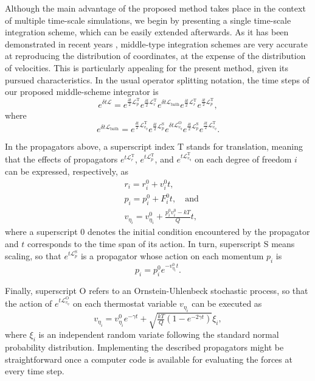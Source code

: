 \documentclass[
aip,
jcp,
reprint,
]{revtex4-1}
\newcommand{\vt}[1]{\boldsymbol{\mathbf{#1}}}          %
\newcommand{\Liu}{\mathcal{L}}
\begin{document}
Although the main advantage of the proposed method takes place in the context of multiple time-scale simulations, we begin by presenting a single time-scale integration scheme, which can be easily extended afterwards.
As it has been demonstrated in recent years \cite{Leimkuhler_2013b, Zhang_2017, Li_2017, Fass_2018, Zhang_2019}, middle-type integration schemes are very accurate at reproducing the distribution of coordinates, at the expense of the distribution of velocities.
This is particularly appealing for the present method, given its pursued characteristics.
In the usual operator splitting notation, the time steps of our proposed middle-scheme integrator is \cite{Zhang_2017}
\begin{equation*}
e^{\delta t\Liu} = e^{\frac{\delta t}{2} \Liu^\mathrm{T}_p} e^{\frac{\delta t}{2} \Liu^\mathrm{T}_r} e^{\delta t\Liu_\mathrm{bath}} e^{\frac{\delta t}{2} \Liu^\mathrm{T}_r} e^{\frac{\delta t}{2} \Liu^\mathrm{T}_p},
\end{equation*}
where
\begin{equation*}
e^{\delta t\Liu_\mathrm{bath}} = e^{\frac{\delta t}{2} \Liu^\mathrm{T}_{v_\eta}} e^{\frac{\delta t}{2} \Liu^\mathrm{S}_p} e^{\delta t \Liu^\mathrm{O}_{v_\eta}} e^{\frac{\delta t}{2} \Liu^\mathrm{S}_p} e^{\frac{\delta t}{2} \Liu^\mathrm{T}_{v_\eta}}.
\end{equation*}

In the propagators above, a superscript index $\mathrm{T}$ stands for translation, meaning that the effects of propagators $e^{t \Liu^\mathrm{T}_r}$, $e^{t \Liu^\mathrm{T}_p}$, and $e^{t \Liu^\mathrm{T}_{v_\eta}}$ on each degree of freedom $i$ can be expressed, respectively, as
\begin{align}
&r_i = r_i^0 + v_i^0 t, \label{eq:NHL move}\\
&p_i = p_i^0 + F_i^0 t, \quad \mathrm{and} \\
&v_{\eta_i} = v_{\eta_i}^0 + \frac{p_i^0 v_i^0 - kT}{Q} t,
\end{align}
where a superscript $0$ denotes the initial condition encountered by the propagator and $t$ corresponds to the time span of its action.
In turn, superscript $\mathrm{S}$ means scaling, so that $e^{t \Liu^\mathrm{S}_p}$ is a propagator whose action on each momentum $p_i$ is
\begin{equation}
p_i = p_i^0 e^{-v_{\eta_i}^0 t}.
\end{equation}

Finally, superscript $\mathrm{O}$ refers to an Ornstein-Uhlenbeck stochastic process, so that the action of $e^{t \Liu^\mathrm{O}_{v_\eta}}$ on each thermostat variable $v_{\eta_i}$ can be executed as
\begin{equation}
v_{\eta_i} = v_{\eta_i}^0 e^{-\gamma t} + \sqrt{\tfrac{kT}{Q}(1 - e^{-2\gamma t})} \xi_i,
\end{equation}
where $\xi_i$ is an independent random variate following the standard normal probability distribution.
Implementing the described propagators might be straightforward once a computer code is available for evaluating the forces at every time step.
\end{document}
